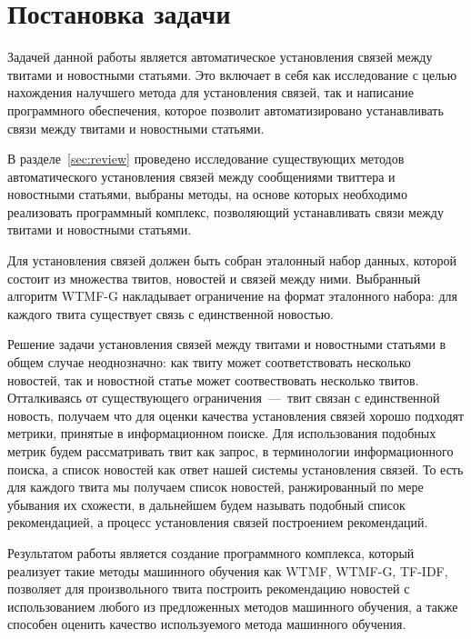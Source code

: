 
\section{Постановка задачи}

    Задачей данной работы является автоматическое установления связей между твитами и новостными статьями.
    Это включает в себя как исследование с целью нахождения налучшего метода для установления связей, так и написание программного обеспечения,
    которое позволит автоматизировано устанавливать связи между твитами и новостными статьями.

    В разделе~\ref{sec:review} проведено исследование существующих методов автоматического установления связей между сообщениями твиттера и новостными статьями,
     выбраны методы, на основе которых необходимо реализовать программный комплекс, позволяющий устанавливать связи между твитами и новостными статьями.

    Для установления связей должен быть собран эталонный набор данных, которой состоит из множества твитов, новостей и связей между ними. Выбранный алгоритм WTMF-G накладывает ограничение на формат эталонного набора: для каждого твита существует связь с единственной новостью.

    Решение задачи установления связей между твитами и новостными статьями в общем случае неоднозначно:
    как твиту может соответствовать несколько новостей, так и новостной статье может соотвествовать несколько твитов.
    Отталкиваясь от существующего ограничения~---~твит связан с единственной новость, получаем что для оценки качества установления связей хорошо подходят метрики, принятые в информационном поиске.
    Для использования подобных метрик будем рассматривать твит как запрос, в терминологии информационного поиска, а список новостей как ответ нашей системы установления связей. То есть для каждого твита мы получаем список новостей, ранжированный по мере убывания их схожести, в дальнейшем будем называть подобный список рекомендацией, а процесс установления связей построением рекомендаций.

    Результатом работы является создание программного комплекса, который реализует такие методы машинного обучения как WTMF, WTMF-G, TF-IDF,
    позволяет для произвольного твита построить рекомендацию новостей с использованием любого из предложенных методов машинного обучения,
    а также способен оценить качество используемого метода машинного обучения.